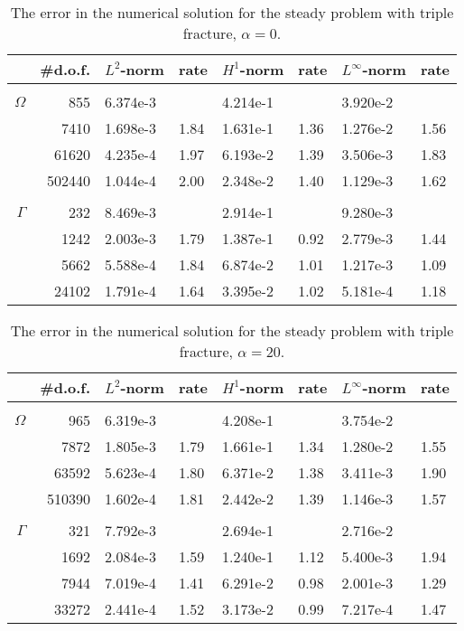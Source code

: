 \documentclass{article}
\begin{document}
\begin{table}[t]
\begin{center}
\caption{The error in the numerical solution for the steady problem with  triple fracture, $\alpha = 0$.
\label{tab:triple0}}\smallskip
\small
\begin{tabular}{rr|llllll}\hline
&\#d.o.f. & $L^2$-norm & rate & $H^1$-norm& rate & $L^\infty$-norm& rate \\ \hline\\[-2ex]
{$\Omega$}
&855&	6.374e-3     &        &4.214e-1&          & 3.920e-2&      \\
&7410&	 1.698e-3    & 1.84   &1.631e-1&1.36      & 1.276e-2& 1.56 \\
&61620&	4.235e-4     & 1.97   &6.193e-2&1.39      & 3.506e-3& 1.83 \\
&502440& 1.044e-4    & 2.00   &2.348e-2&1.40      & 1.129e-3& 1.62 \\ \hline\\[-2ex]
{$\Gamma$}
&232& 8.469e-3       &         &2.914e-1 &          &9.280e-3&     \\
&1242&2.003e-3	       & 1.79  &1.387e-1 & 0.92     &2.779e-3& 1.44\\
&5662&5.588e-4	       & 1.84  &6.874e-2 & 1.01     &1.217e-3& 1.09\\
&24102&1.791e-4       &  1.64  &3.395e-2 & 1.02     &5.181e-4& 1.18\\  \hline
\end{tabular}
\end{center}
\end{table}

\begin{table}[t]
\begin{center}
\caption{The error in the numerical solution for the steady problem with  triple fracture, $\alpha = 20$.
\label{tab:triple20}}\smallskip
\small
\begin{tabular}{rr|llllll}\hline
&\#d.o.f. & $L^2$-norm & rate & $H^1$-norm& rate & $L^\infty$-norm& rate \\ \hline\\[-2ex]
{$\Omega$}
&965&6.319e-3&               &4.208e-1&        &3.754e-2  &    \\
&7872&1.805e-3      & 1.79   &1.661e-1& 1.34   &1.280e-2  &1.55\\
&63592& 5.623e-4    & 1.80   &6.371e-2& 1.38   & 3.411e-3 &1.90\\
&510390&1.602e-4    & 1.81   &2.442e-2& 1.39   & 1.146e-3 &1.57\\\hline\\[-2ex]
{$\Gamma$}
&321& 7.792e-3    &       &2.694e-1&        &2.716e-2&     \\
&1692&2.084e-3    & 1.59  &1.240e-1& 1.12   &5.400e-3& 1.94\\
&7944&7.019e-4    & 1.41  &6.291e-2& 0.98   &2.001e-3& 1.29\\
&{33272}&{2.441e-4}   & {1.52}  &{3.173e-2}& {0.99}   &{7.217e-4}& {1.47}\\  \hline
\end{tabular}
\end{center}
\end{table}
\end{document}
